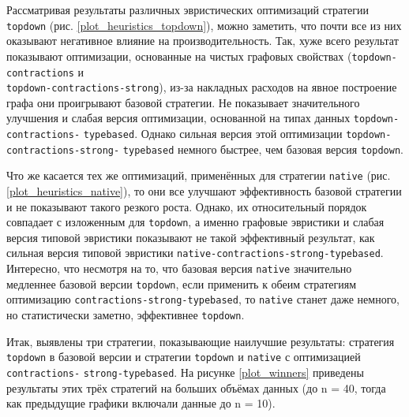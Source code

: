 \documentclass[../diploma.tex]{subfiles}
\begin{document}
Рассматривая результаты различных эвристических оптимизаций стратегии \\\texttt{topdown} (рис. \ref{plot_heuristics_topdown}), можно заметить, что почти все из них оказывают негативное влияние на производительность. Так, хуже всего результат показывают оптимизации, основанные на чистых графовых свойствах (\texttt{topdown-contractions} и \\\texttt{topdown-contractions-strong}), из-за накладных расходов на явное построение графа они проигрывают базовой стратегии. Не показывает значительного улучшения и слабая версия оптимизации, основанной на типах данных \texttt{topdown-contractions-} \texttt{typebased}. Однако сильная версия этой оптимизации \texttt{topdown-contractions-strong-} \texttt{typebased} немного быстрее, чем базовая версия \texttt{topdown}.

Что же касается тех же оптимизаций, применённых для стратегии \texttt{native} (рис. \ref{plot_heuristics_native}), то они все улучшают эффективность базовой стратегии и не показывают такого резкого роста. Однако, их относительный порядок совпадает с изложенным для \texttt{topdown}, а именно графовые эвристики и слабая версия типовой эвристики показывают не такой эффективный результат, как сильная версия типовой эвристики \texttt{native-contractions-strong-typebased}. Интересно, что несмотря на то, что базовая версия \texttt{native} значительно медленнее базовой версии \texttt{topdown}, если применить к обеим стратегиям оптимизацию \texttt{contractions-strong-typebased}, то \texttt{native} станет даже немного, но статистически заметно, эффективнее \texttt{topdown}.

Итак, выявлены три стратегии, показывающие наилучшие результаты: стратегия \texttt{topdown} в базовой версии и стратегии \texttt{topdown} и \texttt{native} с оптимизацией \texttt{contractions-} \texttt{strong-typebased}. На рисунке \ref{plot_winners} приведены результаты этих трёх стратегий на больших объёмах данных (до n = 40, тогда как предыдущие графики включали данные до n = 10). 
\end{document}
